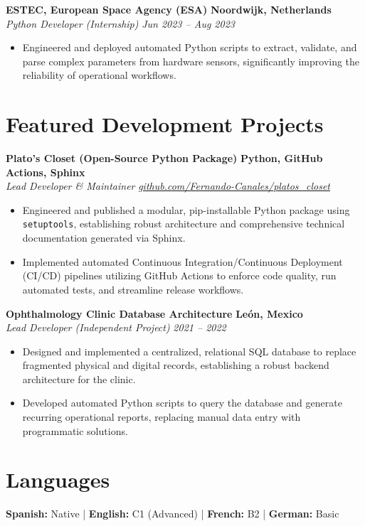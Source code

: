 \documentclass[10pt,a4paper]{article}
\begin{document}
\textbf{ESTEC, European Space Agency (ESA)} \hfill \textbf{Noordwijk, Netherlands}\\
\textit{Python Developer (Internship)}  \hfill \textit{Jun 2023 -- Aug 2023}
\begin{itemize}[leftmargin=1.5em]
    \item Engineered and deployed automated Python scripts to extract, validate, and parse complex parameters from hardware sensors, significantly improving the reliability of operational workflows.
\end{itemize}

\section*{Featured Development Projects}
\textbf{Plato's Closet (Open-Source Python Package)} \hfill \textbf{Python, GitHub Actions, Sphinx} \\
\textit{Lead Developer \& Maintainer} \hfill \textit{\href{https://github.com/Fernando-Canales/platos_closet}{github.com/Fernando-Canales/platos\_closet}}
\begin{itemize}[leftmargin=1.5em]
    \item Engineered and published a modular, pip-installable Python package using \texttt{setuptools}, establishing robust architecture and comprehensive technical documentation generated via Sphinx.
    \item Implemented automated Continuous Integration/Continuous Deployment (CI/CD) pipelines utilizing GitHub Actions to enforce code quality, run automated tests, and streamline release workflows.
\end{itemize}

\textbf{Ophthalmology Clinic Database Architecture} \hfill \textbf{León, Mexico} \\
\textit{Lead Developer (Independent Project)} \hfill \textit{2021 -- 2022}
\begin{itemize}[leftmargin=1.5em]
    \item Designed and implemented a centralized, relational SQL database to replace fragmented physical and digital records, establishing a robust backend architecture for the clinic.
    \item Developed automated Python scripts to query the database and generate recurring operational reports, replacing manual data entry with programmatic solutions.
\end{itemize}

\section*{Languages}
\textbf{Spanish:} Native \quad | \quad \textbf{English:} C1 (Advanced) \quad | \quad \textbf{French:} B2 \quad | \quad \textbf{German:} Basic
\end{document}
